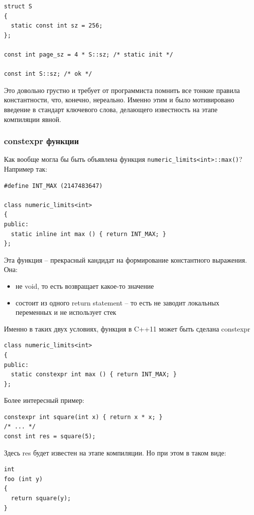 \documentclass[a4paper,12pt,oneside]{article}
\begin{document}
\begin{lstlisting}
struct S 
{
  static const int sz = 256;
};

const int page_sz = 4 * S::sz; /* static init */

const int S::sz; /* ok */
\end{lstlisting}

Это довольно грустно и требует от программиста помнить все тонкие правила константности, что, конечно, нереально. Именно этим и было мотивировано введение в стандарт ключевого слова, делающего известность на этапе компиляции явной.

\subsubsection{constexpr функции}

Как вообще могла бы быть объявлена функция \lstinline!numeric_limits<int>::max()!? Например так:

\begin{lstlisting}
#define INT_MAX (2147483647)

class numeric_limits<int>
{
public:
  static inline int max () { return INT_MAX; }
};
\end{lstlisting}

Эта функция -- прекрасный кандидат на формирование константного выражения. Она:
\begin{itemize}
\item не void, то есть возвращает какое-то значение
\item состоит из одного return statement -- то есть не заводит локальных переменных и не использует стек
\end{itemize}

Именно в таких двух условиях, функция в C++11 может быть сделана constexpr

\begin{lstlisting}
class numeric_limits<int>
{
public:
  static constexpr int max () { return INT_MAX; }
};
\end{lstlisting}

Более интересный пример:

\begin{lstlisting}
constexpr int square(int x) { return x * x; }
/* ... */
const int res = square(5);
\end{lstlisting}

Здесь res будет известен на этапе компиляции. Но при этом в таком виде:

\begin{lstlisting}
int
foo (int y)
{
  return square(y);
}
\end{lstlisting}
\end{document}
